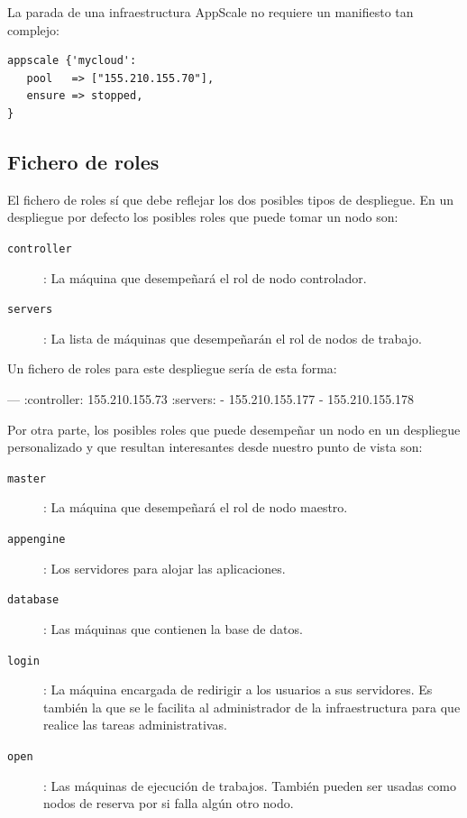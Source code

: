 La parada de una infraestructura AppScale no requiere un manifiesto tan complejo:

\begin{lstlisting}
appscale {'mycloud':
   pool   => ["155.210.155.70"],
   ensure => stopped,
}
\end{lstlisting}

\subsection{Fichero de roles}

El fichero de roles sí que debe reflejar los dos posibles tipos de despliegue. En un despliegue por defecto los posibles roles que puede tomar un nodo son:

\begin{description}
\item[\texttt{controller}]: La máquina que desempeñará el rol de nodo controlador.
\item[\texttt{servers}]: La lista de máquinas que desempeñarán el rol de nodos de trabajo.
\end{description}

Un fichero de roles para este despliegue sería de esta forma:

\begin{yamlcode}
--- 
:controller: 155.210.155.73
:servers: 
- 155.210.155.177
- 155.210.155.178
\end{yamlcode}

Por otra parte, los posibles roles que puede desempeñar un nodo en un despliegue personalizado y que resultan interesantes desde nuestro punto de vista son:

\begin{description}
\item[\texttt{master}]: La máquina que desempeñará el rol de nodo maestro.
\item[\texttt{appengine}]: Los servidores para alojar las aplicaciones.
\item[\texttt{database}]: Las máquinas que contienen la base de datos.
\item[\texttt{login}]: La máquina encargada de redirigir a los usuarios a sus servidores. Es también la que se le facilita al administrador de la infraestructura para que realice las tareas administrativas.
\item[\texttt{open}]: Las máquinas de ejecución de trabajos. También pueden ser usadas como nodos de reserva por si falla algún otro nodo.
\end{description}


